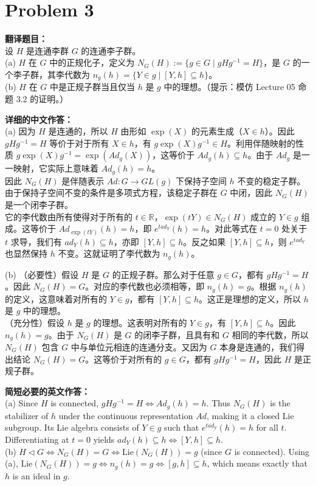 \documentclass{ctexart}
\begin{document}
\vspace{2em}
\section*{Problem 3}
\textbf{翻译题目：}\\
设 $H$ 是连通李群 $G$ 的连通李子群。\\
(a) $H$ 在 $G$ 中的正规化子，定义为 $N_G(H) := \{g \in G \mid gHg^{-1} = H\}$，是 $G$ 的一个李子群，其李代数为 $n_g(h) = \{Y \in g \mid [Y, h] \subseteq h\}$。\\
(b) $H$ 在 $G$ 中是正规子群当且仅当 $h$ 是 $g$ 中的理想。（提示：模仿 Lecture 05 命题 3.2 的证明。）

\vspace{1em}
\textbf{详细的中文作答：}\\
(a) 因为 $H$ 是连通的，所以 $H$ 由形如 $\exp(X)$ 的元素生成（$X \in h$）。因此 $gHg^{-1} = H$ 等价于对于所有 $X \in h$，有 $g\exp(X)g^{-1} \in H$。利用伴随映射的性质 $g\exp(X)g^{-1} = \exp(Ad_g(X))$，这等价于 $Ad_g(h) \subseteq h$。由于 $Ad_g$ 是一一映射，它实际上意味着 $Ad_g(h) = h$。\\
因此 $N_G(H)$ 是伴随表示 $Ad: G \to GL(g)$ 下保持子空间 $h$ 不变的稳定子群。由于保持子空间不变的条件是多项式方程，该稳定子群在 $G$ 中闭，因此 $N_G(H)$ 是一个闭李子群。\\
它的李代数由所有使得对于所有的 $t \in \mathbb{R}$，$\exp(tY) \in N_G(H)$ 成立的 $Y \in g$ 组成。这等价于 $Ad_{\exp(tY)}(h) = h$，即 $e^{t ad_Y}(h) = h$。对此等式在 $t=0$ 处关于 $t$ 求导，我们有 $ad_Y(h) \subseteq h$，亦即 $[Y, h] \subseteq h$。反之如果 $[Y, h] \subseteq h$，则 $e^{t ad_Y}$ 也显然保持 $h$ 不变。这就证明了李代数为 $n_g(h)$。

(b) （必要性）假设 $H$ 是 $G$ 的正规子群。那么对于任意 $g \in G$，都有 $gHg^{-1} = H$。因此 $N_G(H) = G$。对应的李代数也必须相等，即 $n_g(h) = g$。根据 $n_g(h)$ 的定义，这意味着对所有的 $Y \in g$，都有 $[Y, h] \subseteq h$。这正是理想的定义，所以 $h$ 是 $g$ 中的理想。\\
（充分性）假设 $h$ 是 $g$ 的理想。这表明对所有的 $Y \in g$，有 $[Y, h] \subseteq h$。因此 $n_g(h) = g$。由于 $N_G(H)$ 是 $G$ 的闭李子群，且具有和 $G$ 相同的李代数，所以 $N_G(H)$ 包含 $G$ 中与单位元相连的连通分支。又因为 $G$ 本身是连通的，我们得出结论 $N_G(H) = G$。这等价于对所有的 $g \in G$，都有 $gHg^{-1} = H$，因此 $H$ 是正规子群。

\vspace{1em}
\textbf{简短必要的英文作答：}\\
(a) Since $H$ is connected, $gHg^{-1} = H \iff Ad_g(h) = h$. Thus $N_G(H)$ is the stabilizer of $h$ under the continuous representation $Ad$, making it a closed Lie subgroup. Its Lie algebra consists of $Y \in g$ such that $e^{t ad_Y}(h) = h$ for all $t$. Differentiating at $t=0$ yields $ad_Y(h) \subseteq h \iff [Y, h] \subseteq h$.\\
(b) $H \triangleleft G \iff N_G(H) = G \iff \text{Lie}(N_G(H)) = g$ (since $G$ is connected). Using (a), $\text{Lie}(N_G(H)) = g \iff n_g(h) = g \iff [g, h] \subseteq h$, which means exactly that $h$ is an ideal in $g$.
\end{document}
